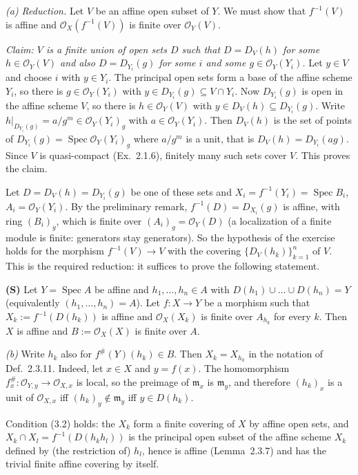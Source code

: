 \documentclass[11pt]{article}
\begin{document}
\emph{(a) Reduction.} Let $V$ be an affine open subset of $Y$. We must show that $f^{-1}(V)$ is affine and $\mathcal{O}_X(f^{-1}(V))$ is finite over $\mathcal{O}_Y(V)$.

\emph{Claim: $V$ is a finite union of open sets $D$ such that $D=D_V(h)$ for some $h\in\mathcal{O}_Y(V)$ and also $D=D_{Y_i}(g)$ for some $i$ and some $g\in\mathcal{O}_Y(Y_i)$.} Let $y\in V$ and choose $i$ with $y\in Y_i$. The principal open sets form a base of the affine scheme $Y_i$, so there is $g\in\mathcal{O}_Y(Y_i)$ with $y\in D_{Y_i}(g)\subseteq V\cap Y_i$. Now $D_{Y_i}(g)$ is open in the affine scheme $V$, so there is $h\in\mathcal{O}_Y(V)$ with $y\in D_V(h)\subseteq D_{Y_i}(g)$. Write $h|_{D_{Y_i}(g)}=a/g^m\in\mathcal{O}_Y(Y_i)_g$ with $a\in\mathcal{O}_Y(Y_i)$. Then $D_V(h)$ is the set of points of $D_{Y_i}(g)=\operatorname{Spec}\mathcal{O}_Y(Y_i)_g$ where $a/g^m$ is a unit, that is $D_V(h)=D_{Y_i}(ag)$. Since $V$ is quasi-compact (Ex.~2.1.6), finitely many such sets cover $V$. This proves the claim.

Let $D=D_V(h)=D_{Y_i}(g)$ be one of these sets and $X_i=f^{-1}(Y_i)=\operatorname{Spec}B_i$, $A_i=\mathcal{O}_Y(Y_i)$. By the preliminary remark, $f^{-1}(D)=D_{X_i}(g)$ is affine, with ring $(B_i)_g$, which is finite over $(A_i)_g=\mathcal{O}_Y(D)$ (a localization of a finite module is finite: generators stay generators). So the hypothesis of the exercise holds for the morphism $f^{-1}(V)\to V$ with the covering $\{D_V(h_k)\}_{k=1}^n$ of $V$. This is the required reduction: it suffices to prove the following statement.

\textbf{(S)} Let $Y=\operatorname{Spec}A$ be affine and $h_1,\dots,h_n\in A$ with $D(h_1)\cup\dots\cup D(h_n)=Y$ (equivalently $(h_1,\dots,h_n)=A$). Let $f:X\to Y$ be a morphism such that $X_k:=f^{-1}(D(h_k))$ is affine and $\mathcal{O}_X(X_k)$ is finite over $A_{h_k}$ for every $k$. Then $X$ is affine and $B:=\mathcal{O}_X(X)$ is finite over $A$.

\emph{(b)} Write $h_k$ also for $f^\#(Y)(h_k)\in B$. Then $X_k=X_{h_k}$ in the notation of Def.~2.3.11. Indeed, let $x\in X$ and $y=f(x)$. The homomorphism $f^\#_x:\mathcal{O}_{Y,y}\to\mathcal{O}_{X,x}$ is local, so the preimage of $\mathfrak{m}_x$ is $\mathfrak{m}_y$, and therefore $(h_k)_x$ is a unit of $\mathcal{O}_{X,x}$ iff $(h_k)_y\notin\mathfrak m_y$ iff $y\in D(h_k)$.

Condition (3.2) holds: the $X_k$ form a finite covering of $X$ by affine open sets, and $X_k\cap X_l=f^{-1}(D(h_kh_l))$ is the principal open subset of the affine scheme $X_k$ defined by (the restriction of) $h_l$, hence is affine (Lemma~2.3.7) and has the trivial finite affine covering by itself.
\end{document}
